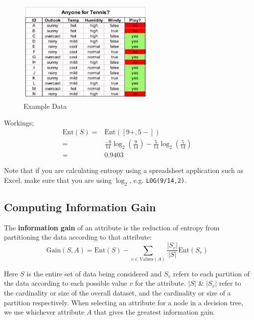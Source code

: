 \documentclass[a4paper,11pt]{article}
\begin{document}
\begin{tcolorbox}[colback=gray!10, colframe=black, title=\textbf{Worked Entropy Example}]
    \begin{figure}[H]
        \centering
        \includegraphics[width=0.6\textwidth]{images/anyonefortennis.png}
        \caption{Example Data}
    \end{figure}

    Workings;
    \begin{align*}
        \text{Ent}(S)   =& \text{Ent}([9+, 5-]) \\
                        =& \frac{-9}{14} \log_2 \left( \frac{9}{14} \right) - \frac{5}{14} \log_2 \left( \frac{5}{14} \right) \\
                        =& 0.9403
    \end{align*}

    Note that if you are calculating entropy using a spreadsheet application such as Excel, make sure that you are using $\log_2$, e.g. \verb|LOG(9/14,2)|.
\end{tcolorbox}

\subsection{Computing Information Gain}
The \textbf{information gain} of an attribute is the reduction of entropy from partitioning the data according to that attribute:
\[
    \text{Gain}(S,A) = \text{Ent}(S) - \sum_{v \in \text{Values}(A)} \frac{\left| S_v \right|}{\left| S \right|} \text{Ent}(S_v)
\]

Here $S$ is the entire set of data being considered and $S_v$ refers to each partition of the data according to each possible value $v$ for the attribute.
$\left| S \right|$ \& $\left| S_v \right|$ refer to the cardinality or size of the overall dataset, and the cardinality or size of a partition respectively.
When selecting an attribute for a node in a decision tree, we use whichever attribute $A$ that gives the greatest information gain.
\end{document}
